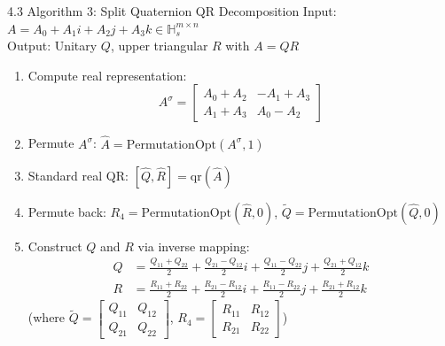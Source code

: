 \documentclass{beamer}
\begin{document}
\begin{frame}{4.3 Algorithm 3: Split Quaternion QR Decomposition}
\footnotesize
    Input: $A = A_0 + A_1i + A_2j + A_3k \in \mathbb{H}_s^{m \times n}$ \\
    Output: Unitary $Q$, upper triangular $R$ with $A=QR$
    \begin{enumerate}
      \item Compute real representation:
        \[
        A^\sigma = \begin{bmatrix} A_0+A_2 & -A_1+A_3 \\ A_1+A_3 & A_0-A_2 \end{bmatrix}
        \]
      \item Permute $A^\sigma$: $\hat{A} = \text{PermutationOpt}(A^\sigma, 1)$
      \item Standard real QR: $[\hat{Q}, \hat{R}] = \text{qr}(\hat{A})$
      \item Permute back: $R_4 = \text{PermutationOpt}(\hat{R}, 0)$, $\tilde{Q} = \text{PermutationOpt}(\hat{Q}, 0)$
      \item Construct $Q$ and $R$ via inverse mapping:
        \begin{align*}
        Q &= \frac{Q_{11}+Q_{22}}{2} + \frac{Q_{21}-Q_{12}}{2}i + \frac{Q_{11}-Q_{22}}{2}j + \frac{Q_{21}+Q_{12}}{2}k \\
        R &= \frac{R_{11}+R_{22}}{2} + \frac{R_{21}-R_{12}}{2}i + \frac{R_{11}-R_{22}}{2}j + \frac{R_{21}+R_{12}}{2}k
        \end{align*}
        (where $\tilde{Q} = \begin{bmatrix} Q_{11} & Q_{12} \\ Q_{21} & Q_{22} \end{bmatrix}$, $R_4 = \begin{bmatrix} R_{11} & R_{12} \\ R_{21} & R_{22} \end{bmatrix}$)
    \end{enumerate}
\end{frame}
\end{document}
